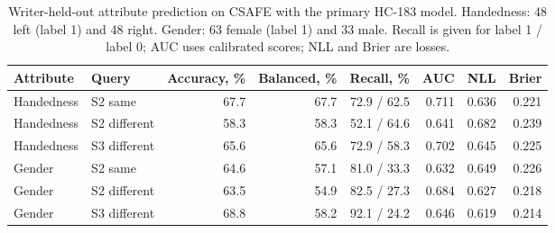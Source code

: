 \begin{table}[ht]
\caption{Writer-held-out attribute prediction on CSAFE with the primary HC-183 model. Handedness: 48 left (label 1) and 48 right. Gender: 63 female (label 1) and 33 male. Recall is given for label 1 / label 0; AUC uses calibrated scores; NLL and Brier are losses.}\label{tab:p2attr}
\centering\footnotesize
\begin{tabular}{llrrrrrr}\toprule
Attribute & Query & Accuracy, \% & Balanced, \% & Recall, \% & AUC & NLL & Brier\\\midrule
Handedness & S2 same & 67.7 & 67.7 & 72.9 / 62.5 & 0.711 & 0.636 & 0.221 \\
Handedness & S2 different & 58.3 & 58.3 & 52.1 / 64.6 & 0.641 & 0.682 & 0.239 \\
Handedness & S3 different & 65.6 & 65.6 & 72.9 / 58.3 & 0.702 & 0.645 & 0.225 \\
Gender & S2 same & 64.6 & 57.1 & 81.0 / 33.3 & 0.632 & 0.649 & 0.226 \\
Gender & S2 different & 63.5 & 54.9 & 82.5 / 27.3 & 0.684 & 0.627 & 0.218 \\
Gender & S3 different & 68.8 & 58.2 & 92.1 / 24.2 & 0.646 & 0.619 & 0.214 \\
\bottomrule
\end{tabular}
\end{table}
